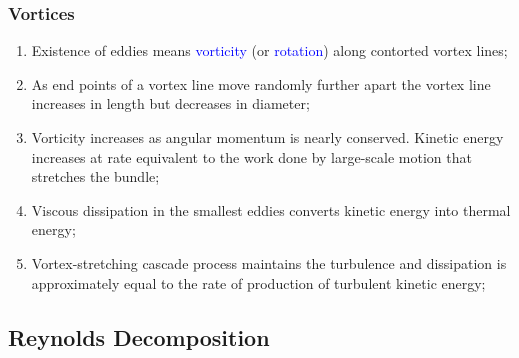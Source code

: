 \documentclass[10pt,compress]{beamer}
\newcommand{\blue}{\textcolor{blue}}
\begin{document}
\begin{frame}
 \frametitle{Vortices}
    \begin{enumerate}%
       \item<1-> Existence of eddies means  \blue{vorticity} (or \blue{rotation}) along contorted vortex lines;
       \item<1-> As end points of a vortex line move randomly further apart the vortex line increases in length but decreases in diameter;
       \item<1-> Vorticity increases as angular momentum is nearly conserved. Kinetic energy increases at rate equivalent to the work done by large-scale motion that stretches the bundle;
       \item<2-> Viscous dissipation in the smallest eddies converts kinetic energy into thermal energy;
       \item<2-> Vortex-stretching cascade process maintains the turbulence and dissipation is approximately equal to the rate of production of turbulent kinetic energy;
       \end{enumerate} 
\end{frame}

\subsection{Reynolds Decomposition}
\end{document}
